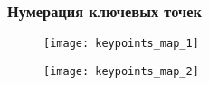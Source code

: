 \begin{frame}
    \frametitle{Нумерация ключевых точек}
    \begin{figure}
        \begin{minipage}[!h]{0.49\linewidth}
            \centering
            \texttt{[image: keypoints\_map\_1]}
        \end{minipage}
        \hfill
        \begin{minipage}[!h]{0.49\linewidth}
            \centering
            \texttt{[image: keypoints\_map\_2]}
        \end{minipage}
    \end{figure}
\end{frame}